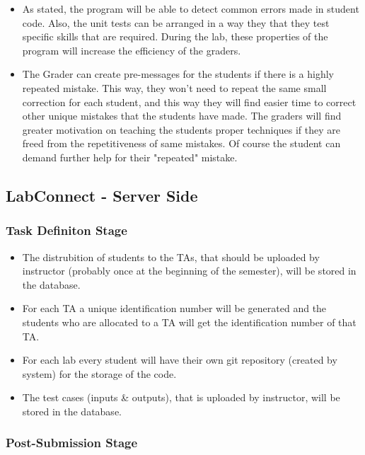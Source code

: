 \documentclass[a4paper, 12pt]{article}
\begin{document}
    \begin{itemize}
      \item As stated, the program will be able to detect common errors made in student code.
      Also, the unit tests can be arranged in a way they that they test specific skills that are
      required. During the lab, these properties of the program will increase the efficiency of the
      graders.
      \item The Grader can create pre-messages for the students if there is a highly repeated
      mistake. This way, they won't need to repeat the same small correction for each student,
      and this way they will find easier time to correct other unique mistakes that the students
      have made. The graders will find greater motivation on teaching the students proper techniques
      if they are freed from the repetitiveness of same mistakes. Of course the student can demand
      further help for their "repeated" mistake.
    \end{itemize}

    \subsection{LabConnect - Server Side}

    \subsubsection{Task Definiton Stage}
    \begin{itemize}
      \item The distrubition of students to the TAs, that should be uploaded by instructor (probably once at the
      beginning of the semester), will be stored in the database.
      \item For each TA a unique identification number will be generated and the students who are allocated to a
      TA will get the identification number of that TA.
      \item For each lab every student will have their own git repository (created by system) for the storage of the
      code.
      \item The test cases (inputs \& outputs), that is uploaded by instructor, will be stored in the database.
    \end{itemize}

    \subsubsection{Post-Submission Stage}
\end{document}
